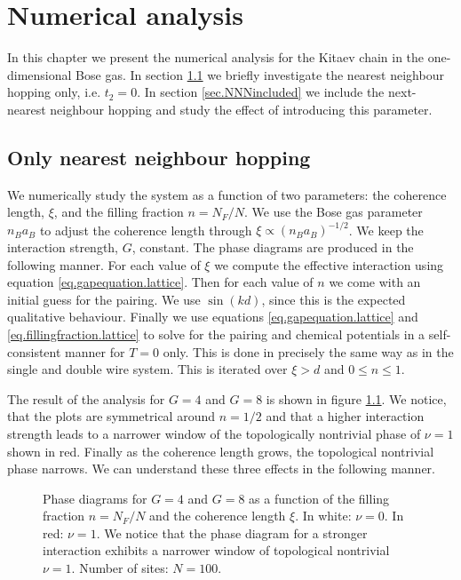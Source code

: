 \chapter{Numerical analysis} %

\label{Chapter8} 

In this chapter we present the numerical analysis for the Kitaev chain in the one-dimensional Bose gas. In section \ref{sec.onlyNN} we briefly investigate the nearest neighbour hopping only, i.e. $t_2 = 0$. In section \ref{sec.NNNincluded} we include the next-nearest neighbour hopping and study the effect of introducing this parameter. 
 
\section{Only nearest neighbour hopping} \label{sec.onlyNN}
We numerically study the system as a function of two parameters: the coherence length, $\xi$, and the filling fraction $n = N_F/N$. We use the Bose gas parameter $n_Ba_B$ to adjust the coherence length through $\xi \propto (n_Ba_B)^{-1/2}$. We keep the interaction strength, $G$, constant. The phase diagrams are produced in the following manner. For each value of $\xi$ we compute the effective interaction using equation \eqref{eq.gapequation.lattice}. Then for each value of $n$ we come with an initial guess for the pairing. We use $\sin(kd)$, since this is the expected qualitative behaviour. Finally we use equations \eqref{eq.gapequation.lattice} and \eqref{eq.fillingfraction.lattice} to solve for the pairing and chemical potentials in a self-consistent manner for $T = 0$ only. This is done in precisely the same way as in the single and double wire system. This is iterated over $\xi > d$ and $0\leq n \leq 1$. 

The result of the analysis for $G = 4$ and $G = 8$ is shown in figure \ref{fig.phasediagram.t20}. We notice, that the plots are symmetrical around $n = 1/2$ and that a higher interaction strength leads to a narrower window of the topologically nontrivial phase of $\nu = 1$ shown in red. Finally as the coherence length grows, the topological nontrivial phase narrows. We can understand these three effects in the following manner. 

\begin{figure}
\begin{center}

\caption{Phase diagrams for $G = 4$ and $G = 8$ as a function of the filling fraction $n = N_F/N$ and the coherence length $\xi$. In white: $\nu = 0$. In red: $\nu = 1$. We notice that the phase diagram for a stronger interaction exhibits a narrower window of topological nontrivial $\nu = 1$. Number of sites: $N = 100$. }
\label{fig.phasediagram.t20}
\end{center}
\end{figure}

